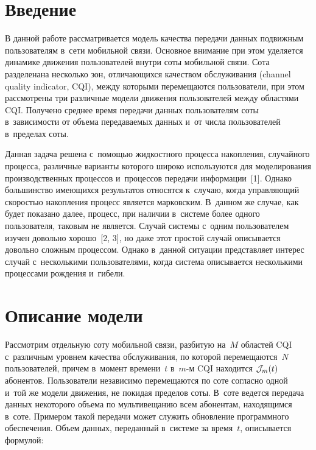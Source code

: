 
\thispagestyle{headings}

\begin{multicols}{2}

\label{st\stat}

\section{Введение}

  В данной работе рассматривается модель качества передачи данных 
подвижным пользователям в~сети мобильной связи. Основное внимание при 
этом уделяется динамике движения пользователей внутри соты мобильной 
связи. Сота разделена\linebreak на несколько зон, отличающихся качеством об\-служивания 
(channel quality indicator, CQI), между которы\-ми перемещаются пользователи, 
при этом рассмотрены три различные модели движения пользователей между 
областями CQI. Получено среднее время передачи данных пользователям соты 
в~зависимости от объема передаваемых данных и~от числа пользователей 
в~пределах соты.
  
  Данная задача решена с~помощью жидкостного процесса накопления, 
случайного процесса, различные варианты которого широко используются для 
моделирования производственных процессов и~процессов передачи 
информации~[1]. Однако большинство имеющихся результатов относятся 
к~случаю, когда управляющий скоростью накопления процесс является 
марковским. В~данном же случае, как будет показано далее, процесс, при 
наличии в~системе более одного пользователя, таковым не является. Случай 
системы с~одним пользователем изучен довольно хорошо~[2, 3], но даже этот 
простой случай описывается довольно сложным процессом. Однако в~данной 
ситуации представляет интерес случай с~несколькими пользователями, когда 
система описывается несколькими процессами рождения и~гибели.

\vspace*{-9pt}
  
\section{Описание модели}

\vspace*{-2pt}

  Рассмотрим отдельную соту мобильной связи, разбитую на~$M$ областей 
CQI с~различным уровнем качества обслуживания, по которой 
перемещаются~$N$ пользователей, причем в~момент времени~$t$ в~$m$-м CQI 
находится ${\cal{J}}_m(t)$ абонентов. Пользователи независимо перемещаются по 
соте согласно одной и~той же модели движения, не покидая пределов соты. 
В~соте ведется передача данных некоторого объема по мультивещанию всем 
абонентам, находящимся в~соте. Примером такой передачи может служить 
обновление программного обеспечения. Объем данных, переданный в~системе за 
время~$t$, описывается формулой:


\end{multicols}
